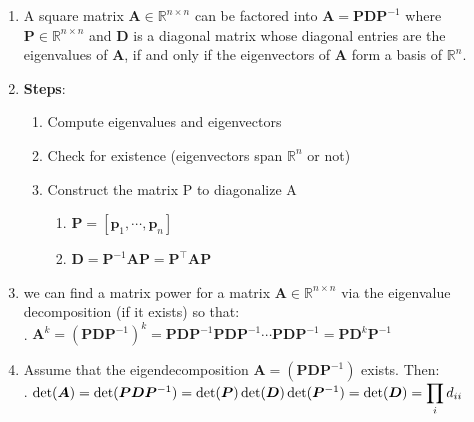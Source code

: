 \begin{enumerate}
    \item 
    \begin{theorem}[Eigendecomposition]
        A square matrix $\bm{A} \in \mathbb{R}^{n\times n}$ can be factored into $\bm{A} = \bm{PDP}^{-1}$ where $\bm{P} \in \mathbb{R}^{n\times n}$ and $\bm{D}$ is a diagonal matrix whose diagonal entries are the eigenvalues of $\bm{A}$, if and only if the eigenvectors of $\bm{A}$ form a basis of $\mathbb{R}^n$.
        \hfill \cite{mfml/book/mml/Deisenroth-Faisal-Ong}
    \end{theorem}

    \item \textbf{Steps}:
    \begin{enumerate}
        \item Compute eigenvalues and eigenvectors

        \item Check for existence (eigenvectors span $\mathbb{R}^n$ or not)

        \item Construct the matrix P to diagonalize A
        \begin{enumerate}
            \item $\bm{P} = [\bm{p}_1, \cdots, \bm{p}_n]$

            \item $\bm{D} = \bm{P}^{-1}\bm{AP} = \bm{P}^{\top}\bm{AP}$
        \end{enumerate}
    \end{enumerate}

    \item we can find a matrix power for a matrix $\bm{A} \in \mathbb{R}^{n\times n}$ via the eigenvalue decomposition (if it exists) so that:
    \hfill \cite{mfml/book/mml/Deisenroth-Faisal-Ong}
    \\
    .\hfill
    $
        \bm{A}^k 
        = (\bm{PDP}^{-1})^k 
        = \bm{PDP}^{-1}\bm{PDP}^{-1}\cdots \bm{PDP}^{-1} 
        = \bm{PD}^k \bm{P}^{-1}
    $
    \hfill \cite{mfml/book/mml/Deisenroth-Faisal-Ong}

    \item Assume that the eigendecomposition $\bm{A} = (\bm{PDP}^{-1})$ exists. Then: 
    \hfill \cite{mfml/book/mml/Deisenroth-Faisal-Ong}
    \\
    .\hfill
    $
        \det(\bm{A}) 
        = \det(\bm{PDP}^{ -1}) 
        = \det(\bm{P}) \det(\bm{D}) \det(\bm{P}^{-1})
        = \det(\bm{D})
        = \displaystyle\prod_{i} d_{ii}
    $
    \hfill \cite{mfml/book/mml/Deisenroth-Faisal-Ong}
\end{enumerate}



